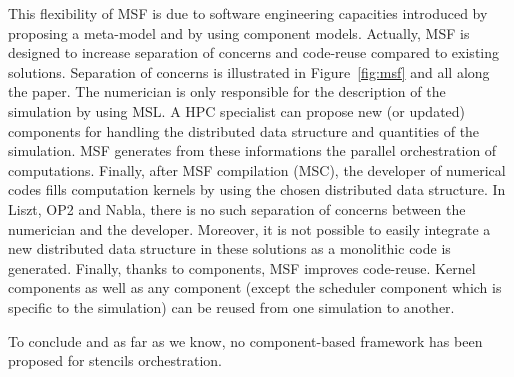 This flexibility of MSF is due to software engineering capacities introduced by proposing a meta-model and by using component models. Actually, MSF is designed to increase separation of concerns and code-reuse compared to existing solutions.
Separation of concerns is illustrated in Figure~\ref{fig:msf} and all along the paper. The numerician is only responsible for the description of the simulation by using MSL. A HPC specialist can propose new (or updated) components for handling the distributed data structure and quantities of the simulation. MSF generates from these informations the parallel orchestration of computations. Finally, after MSF compilation (MSC), the developer of numerical codes fills computation kernels by using the chosen distributed data structure. In Liszt, OP2 and Nabla, there is no such separation of concerns between the numerician and the developer. 
Moreover, it is not possible to easily integrate a new distributed data structure in these solutions as a monolithic code is generated.
Finally, thanks to components, MSF improves code-reuse. Kernel components as well as any component (except the scheduler component which is specific to the simulation) can be reused from one simulation to another.

To conclude and as far as we know, no component-based framework has been proposed for stencils orchestration.
